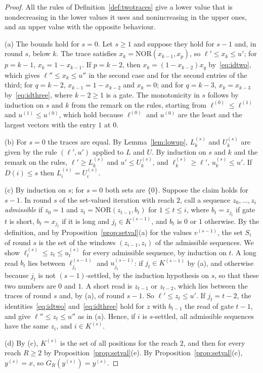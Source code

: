 \documentclass[11pt]{amsart}
\theoremstyle{definition}
\theoremstyle{remark}
\newcommand{\NOR}{\mathrm{NOR}}
\begin{document}
\begin{proof}
All the rules of Definition~\ref{def:twotraces} give a lower value that is nondecreasing in the
lower values it uses and nonincreasing in the upper ones, and an upper value with the opposite
behaviour.

(a) The bounds hold for $s=0$. Let $s\ge1$ and suppose they hold for $s-1$ and, in round $s$,
below $k$. The trace satisfies $x_k=\NOR(x_{k-1},x_p)$, so $\ell'\le x_k\le u'$; for $p=k-1$,
$x_k=1-x_{k-1}$. If $p=k-2$, then $x_k=(1-x_{k-2})x_q$ by~\eqref{eq:idtwo}, which gives
$\ell''\le x_k\le u''$ in the second case and for the second entries of the third; for $q=k-2$,
$x_{k-1}=1-x_{k-2}$ and $x_k=0$; and for $q=k-3$, $x_k=x_{k-3}$ by~\eqref{eq:idthree}, where
$k-2\ge1$ is a gate. The monotonicity in $s$ follows by induction on $s$ and $k$ from the remark
on the rules, starting from $\ell^{(0)}\le\ell^{(1)}$ and $u^{(1)}\le u^{(0)}$, which hold
because $\ell^{(0)}$ and $u^{(0)}$ are the least and the largest vectors with the entry $1$ at
$0$.

(b) For $s=0$ the traces are equal. By Lemma~\ref{lem:lowup}, $L^{(s)}_k$ and $U^{(s)}_k$ are
given by the rule $(\ell',u')$ applied to $L$ and $U$. By induction on $s$ and $k$ and the
remark on the rules, $\ell'\ge L^{(s)}_k$ and $u'\le U^{(s)}_k$, and
$\ell^{(s)}_k\ge\ell'$, $u^{(s)}_k\le u'$. If $D(i)\le s$ then $L^{(s)}_i=U^{(s)}_i$.

(c) By induction on $s$; for $s=0$ both sets are $\{0\}$. Suppose the claim holds for $s-1$.
In round $s$ of the set-valued iteration with reach $2$, call a sequence $z_0,\dots,z_i$
\emph{admissible} if $z_0=1$ and $z_t=\NOR(z_{t-1},b_t)$ for $1\le t\le i$, where $b_t=z_{j_t}$
if gate $t$ is short, $b_t=x_{j_t}$ if it is long and $j_t\in K^{(s-1)}$, and $b_t$ is $0$ or
$1$ otherwise. By the definition, and by Proposition~\ref{prop:setval}(a) for the values
$v^{(s-1)}$, the set $S_i$ of round $s$ is the set of the windows $(z_{i-1},z_i)$ of the
admissible sequences. We show $\ell^{(s)}_t\le z_t\le u^{(s)}_t$ for every admissible sequence,
by induction on $t$. A long read $b_t$ lies between $\ell^{(s-1)}_{j_t}$ and $u^{(s-1)}_{j_t}$:
if $j_t\in K^{(s-1)}$ by (a), and otherwise because $j_t$ is not $(s-1)$-settled, by the
induction hypothesis on $s$, so that these two numbers are $0$ and $1$. A short read is
$z_{t-1}$ or $z_{t-2}$, which lies between the traces of round $s$ and, by (a), of round $s-1$.
So $\ell'\le z_t\le u'$. If $j_t=t-2$, the identities~\eqref{eq:idtwo}
and~\eqref{eq:idthree} hold for $z$ with $b_{t-1}$ the read of gate $t-1$, and give
$\ell''\le z_t\le u''$ as in (a). Hence, if $i$ is $s$-settled, all admissible sequences have the
same $z_i$, and $i\in K^{(s)}$.

(d) By (c), $K^{(s)}$ is the set of all positions for the reach $2$, and then for every reach
$R\ge2$ by Proposition~\ref{prop:setval}(e). By Proposition~\ref{prop:setval}(c), $y^{(s)}=x$,
so $G_R(y^{(s)})=y^{(s)}$.
\end{proof}
\end{document}

